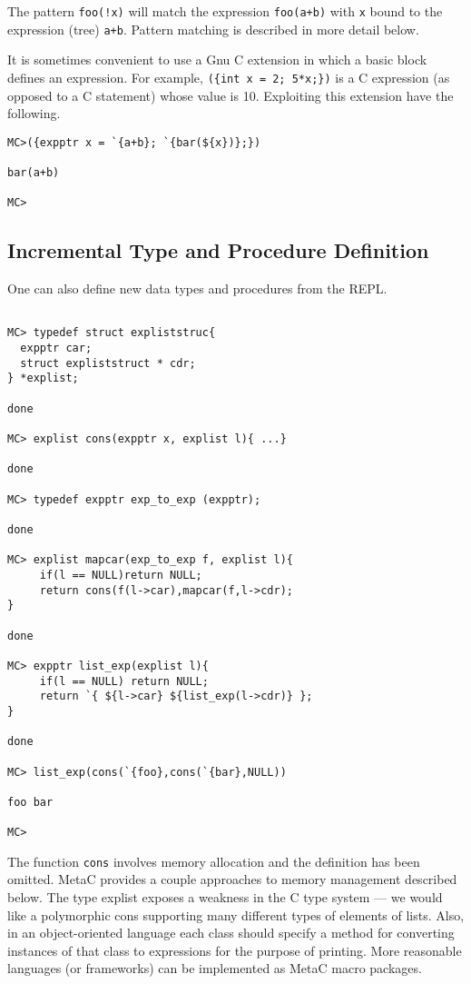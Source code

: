 \documentclass{article}
\begin{document}
The pattern {\tt foo(!x)} will match the expression {\tt foo(a+b)} with {\tt x} bound to the expression (tree) {\tt a+b}.
Pattern matching is described in more detail below.

It is sometimes convenient to use a Gnu C extension in which a basic block defines an expression.  For example,
{\tt (\{int x = 2; 5*x;\})} is a C expression (as opposed to a C statement) whose value is 10.  Exploiting this extension have the following.

\begin{verbatim}
MC>({expptr x = `{a+b}; `{bar(${x})};})

bar(a+b)

MC>
\end{verbatim}

\subsection{Incremental Type and Procedure Definition}

One can also define new data types and procedures from the REPL.

\begin{verbatim}

MC> typedef struct expliststruc{
  expptr car;
  struct expliststruct * cdr;
} *explist;

done

MC> explist cons(expptr x, explist l){ ...}

done

MC> typedef expptr exp_to_exp (expptr);

done

MC> explist mapcar(exp_to_exp f, explist l){
     if(l == NULL)return NULL;
     return cons(f(l->car),mapcar(f,l->cdr);
}

done

MC> expptr list_exp(explist l){
     if(l == NULL) return NULL;
     return `{ ${l->car} ${list_exp(l->cdr)} };
}

done

MC> list_exp(cons(`{foo},cons(`{bar},NULL))

foo bar

MC>
\end{verbatim}

The function {\tt cons} involves memory allocation and the definition has been omitted.  MetaC provides a couple approaches to memory management described below.
The type explist exposes a weakness in the C type system --- we would like a polymorphic cons supporting many different types of elements
of lists. Also, in an object-oriented language each class should specify a method for converting instances of that class to expressions for the purpose of printing.
More reasonable languages (or frameworks) can be implemented as MetaC macro packages.
\end{document}
